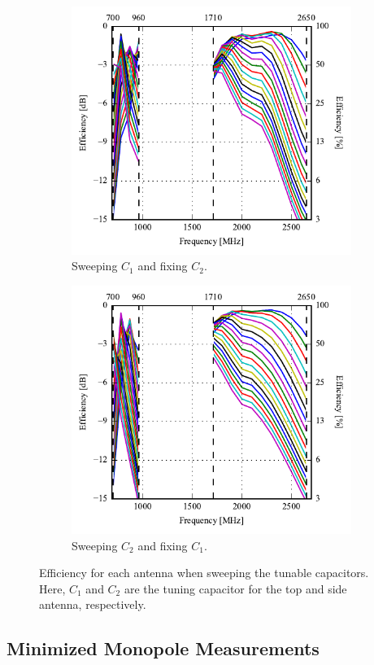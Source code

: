 \begin{figure}[htbp]
    \centering
    \begin{subfigure}{0.49\linewidth}
        \includegraphics{img/tech_sol/monopole/5mm/6pf_eff_ac1}
        \caption{Sweeping $C_1$ and fixing $C_2$.}
    \end{subfigure}
    \hfill
    \begin{subfigure}{0.49\linewidth}
        \includegraphics{img/tech_sol/monopole/5mm/6pf_eff_ac2}
        \caption{Sweeping $C_2$ and fixing $C_1$.}
    \end{subfigure}
    \caption{Efficiency for each antenna when sweeping the tunable capacitors. Here, $C_1$ and $C_2$ are the tuning capacitor for the top and side antenna, respectively.}
    \label{fig:eff_sol1_6pf_free}
\end{figure}

\subsection{Minimized Monopole Measurements}



